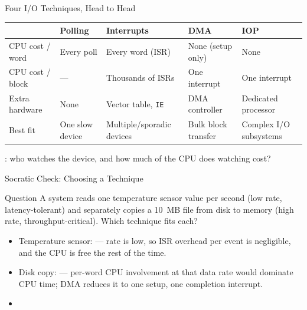 \documentclass[aspectratio=169]{beamer}
\begin{document}
\begin{frame}{Four I/O Techniques, Head to Head}
  \tiny
  \begin{center}
  \begin{tabular}{@{}lllll@{}}
    \toprule
    & \textbf{Polling} & \textbf{Interrupts} & \textbf{DMA} & \textbf{IOP} \\
    \midrule
    CPU cost / word & Every poll & Every word (ISR) & None (setup only) & None \\
    CPU cost / block & --- & Thousands of ISRs & One interrupt & One interrupt \\
    Extra hardware & None & Vector table, \texttt{IE} & DMA controller & Dedicated processor \\
    Best fit & One slow device & Multiple/sporadic devices & Bulk block transfer & Complex I/O subsystems \\
    \bottomrule
  \end{tabular}
  \end{center}
  \vspace{0.3cm}
  \normalsize
  : who watches the device, and how
  much of the CPU does watching cost?
\end{frame}

\begin{frame}{Socratic Check: Choosing a Technique}
  \begin{alertblock}{Question}
    A system reads one temperature sensor value per second (low rate,
    latency-tolerant) and separately copies a 10~MB file from disk to memory
    (high rate, throughput-critical). Which technique fits each?
  \end{alertblock}
  \begin{itemize}
    \item Temperature sensor:  --- rate is low, so ISR
      overhead per event is negligible, and the CPU is free the rest of the
      time.
    \item Disk copy:  --- per-word CPU involvement at that data rate
      would dominate CPU time; DMA reduces it to one setup, one completion
      interrupt.
    \item {}
  \end{itemize}
\end{frame}

\end{document}
